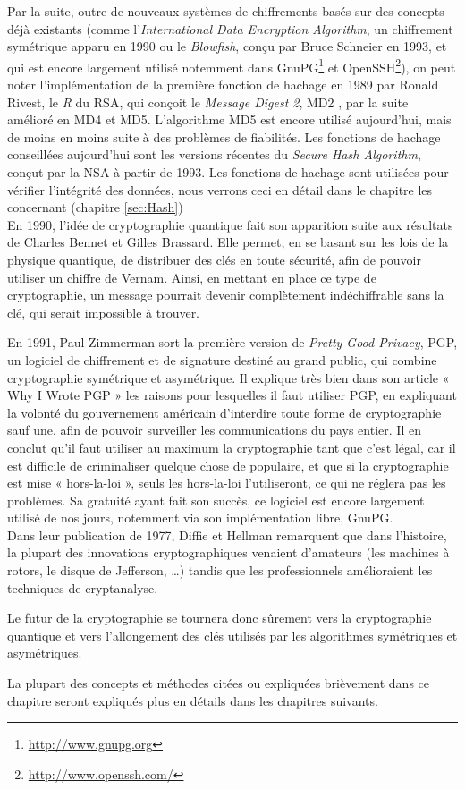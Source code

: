 Par la suite, outre de nouveaux systèmes de chiffrements basés sur des
concepts déjà existants (comme l'\emph{International Data Encryption
  Algorithm}, un chiffrement symétrique apparu en 1990 ou le
\emph{Blowfish}, conçu par Bruce Schneier en 1993, et qui est encore
largement utilisé notemment dans
GnuPG\footnote{\url{http://www.gnupg.org}} et
OpenSSH\footnote{\url{http://www.openssh.com/}}), on peut noter
l'implémentation de la première fonction de hachage en 1989 par Ronald
Rivest, le \emph{R} du RSA, qui conçoit le \emph{Message Digest 2},
MD2 , par la suite amélioré en MD4 et MD5. L'algorithme MD5 est encore
utilisé aujourd'hui, mais de moins en moins suite à des problèmes de
fiabilités. Les fonctions de hachage conseillées aujourd'hui sont les
versions récentes du \emph{Secure Hash Algorithm}, conçut par la NSA à
partir de 1993. Les fonctions de hachage sont utilisées pour vérifier
l'intégrité des données, nous verrons ceci en détail dans le chapitre
les concernant (chapitre \ref{sec:Hash})\\

En 1990, l'idée de cryptographie quantique fait son apparition suite
aux résultats de Charles Bennet et Gilles Brassard. Elle permet, en se
basant sur les lois de la physique quantique, de distribuer des clés
en toute sécurité, afin de pouvoir utiliser un chiffre de
Vernam. Ainsi, en mettant en place ce type de cryptographie, un
message pourrait devenir complètement indéchiffrable sans la clé, qui
serait impossible à trouver.

En 1991, Paul Zimmerman sort la première version de \emph{Pretty Good
  Privacy}, PGP, un logiciel de chiffrement et de signature destiné au
grand public, qui combine cryptographie symétrique et asymétrique. Il
explique très bien dans son article « Why I Wrote PGP
»\cite{WhyIWrotePGP} les raisons pour lesquelles il faut utiliser PGP,
en expliquant la volonté du gouvernement américain d'interdire toute
forme de cryptographie sauf une, afin de pouvoir surveiller les
communications du pays entier. Il en conclut qu'il faut utiliser au
maximum la cryptographie tant que c'est légal, car il est difficile de
criminaliser quelque chose de populaire, et que si la cryptographie
est mise « hors-la-loi », seuls les hors-la-loi l'utiliseront, ce qui
ne réglera pas les problèmes. Sa gratuité ayant fait son succès, ce
logiciel est encore largement
utilisé de nos jours, notemment via son implémentation libre, GnuPG. \\

Dans leur publication de 1977\cite{NewDirectionsInCryptography},
Diffie et Hellman remarquent que dans l'histoire, la plupart des
innovations cryptographiques venaient d'amateurs (les machines à
rotors, le disque de Jefferson, \dots) tandis que les professionnels
amélioraient les techniques de cryptanalyse.

Le futur de la cryptographie se tournera donc sûrement vers la
cryptographie quantique et vers l'allongement des clés utilisés par
les algorithmes symétriques et asymétriques.

La plupart des concepts et méthodes citées ou expliquées brièvement
dans ce chapitre seront expliqués plus en détails dans les chapitres
suivants.
